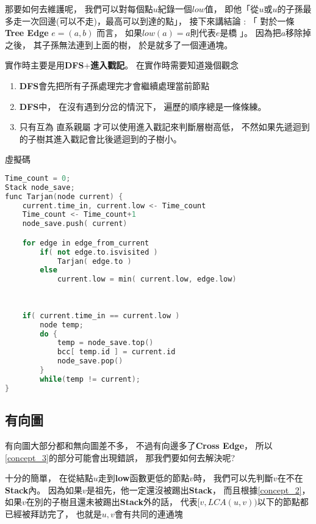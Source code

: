 \documentclass[12pt,oneside]{article}
\begin{document}
那要如何去維護呢，
我們可以對每個點$u$紀錄一個$low$值，
即他「從$u$或$u$的子孫最多走一次回邊(可以不走)，最高可以到達的點」，
接下來講結論 : 「
對於一條\textbf{Tree Edge} $e = (a, b)$ 而言，
如果$low(a) = a$則代表$e$是橋
」。
因為把$a$移除掉之後，
其子孫無法連到上面的樹，
於是就多了一個連通塊。


實作時主要是用\textbf{DFS}+\textbf{進入戳記}。
在實作時需要知道幾個觀念

\begin{adjustwidth}{2em}{0em}
\begin{enumerate}
    \item 
        \textbf{DFS}會先把所有子孫處理完才會繼續處理當前節點
    \item 
        \textbf{DFS}中，
        在沒有遇到分岔的情況下，
        遍歷的順序總是一條條練。 \label{concept_2}
    \item 
        只有互為{\color{red} 直系親屬} 才可以使用進入戳記來判斷層樹高低，
        不然如果先遞迴到的子樹其進入戳記會比後遞迴到的子樹小。 \label{concept_3}
\end{enumerate}
\end{adjustwidth}

\vspace*{2em}
\begin{center}
    虛擬碼
\end{center}
\begin{lstlisting}[language=C++,escapeinside=``]
Time_count = 0;
Stack node_save;
func Tarjan(node current) {
    current.time_in, current.low <- Time_count
    Time_count <- Time_count+1
    node_save.push( current)

    for edge in edge_from_current 
        if( not edge.to.isvisited )
            Tarjan( edge.to )
        else   
            current.low = min( current.low, edge.low) 
    
    
        
    if( current.time_in == current.low ) 
        node temp;
        do {
            temp = node_save.top()
            bcc[ temp.id ] = current.id 
            node_save.pop()
        }
        while(temp != current);
}
\end{lstlisting}
\vspace*{2em}

\subsection{有向圖}

有向圖大部分都和無向圖差不多，
不過有向邊多了\textbf{Cross Edge}，
所以\ref{concept_3}的部分可能會出現錯誤，
那我們要如何去解決呢?

十分的簡單，
在從結點$u$走到\textbf{low}函數更低的節點$v$時，
我們可以先判斷$v$在不在\textbf{Stack}內。
因為如果$v$是祖先，他一定還沒被踢出\textbf{Stack}，
而且根據\ref{concept_2}，
如果$v$在別的子樹且還未被踢出\textbf{Stack}外的話，
代表$[ v, LCA(u, v) )$以下的節點都已經被拜訪完了，
也就是$u, v$會有共同的連通塊
\end{document}

